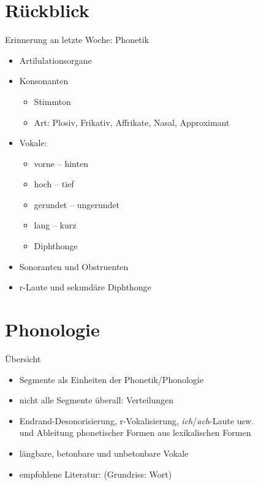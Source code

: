 
\section{Rückblick}

\begin{frame}
  {Erinnerung an letzte Woche: Phonetik}
  \pause
  \begin{itemize}[<+->]
    \item Artilulationsorgane
    \item Konsonanten
      \begin{itemize}
        \item Stimmton
        \item Art: Plosiv, Frikativ, Affrikate, Nasal, Approximant
      \end{itemize}
    \item Vokale:
      \begin{itemize}
        \item vorne -- hinten
        \item hoch -- tief
        \item gerundet -- ungerundet
        \item lang -- kurz
        \item Diphthonge
      \end{itemize}
    \item Sonoranten und Obstruenten
    \item r-Laute und sekundäre Diphthonge
  \end{itemize}
\end{frame}


\section{Phonologie}

\begin{frame}
  {Übersicht}
  \pause
  \begin{itemize}[<+->]
    \item \alert{Segmente} als Einheiten der Phonetik\slash Phonologie
    \item nicht alle Segmente überall: \alert{Verteilungen}
    \item Endrand-Desonorisierung, r-Vokalisierung, \textit{ich}\slash\textit{ach}-Laute usw.\\
      und \alert{Ableitung} phonetischer Formen aus lexikalischen Formen
    \item längbare, betonbare und unbetonbare Vokale
      \Zeile
    \item empfohlene Literatur: \citet{Eisenberg2013a} (Grundriss: Wort)
  \end{itemize}
\end{frame}

